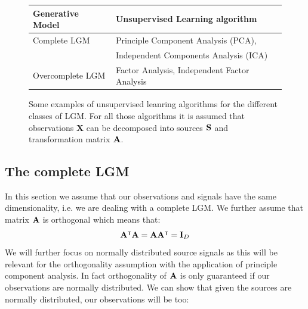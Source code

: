 \begin{figure}[h]
\centering
\begin{tabular}{|l|l|}
\hline 
Generative Model & Unsupervised Learning algorithm \\ 
\hline 
Complete LGM & Principle Component Analysis (PCA), \\ 
             & Independent Components Analysis (ICA) \\ 
Overcomplete LGM & Factor Analysis, Independent Factor Analysis \\ 
\hline 
\end{tabular} 
\caption{Some examples of unsupervised leanring algorithms for the different classes of LGM. 
For all those algorithms it is assumed that observations \textbf{X} can be decomposed into 
sources $\mathbf{S}$ and transformation matrix $\mathbf{A}$.}
\end{figure}

\subsection{The complete LGM}
In this section we assume that our observations and signals have the same dimensionality,
i.e. we are dealing with a complete LGM. We further assume that matrix $\mathbf{A}$ is orthogonal
which means that:
\begin{align}
	 \mathbf{A}^\intercal \mathbf{A} = \mathbf{A} \mathbf{A}^\intercal = \operatorname{\mathbf{I}}_D
\end{align}
\noindent
We will further focus on normally distributed source signals as this will be relevant for the
orthogonality assumption with the application of principle component analysis. In fact orthogonality
of $\mathbf{A}$ is only guaranteed if our observations are normally distributed. We can show that given
the sources are normally distributed, our observations will be too:



